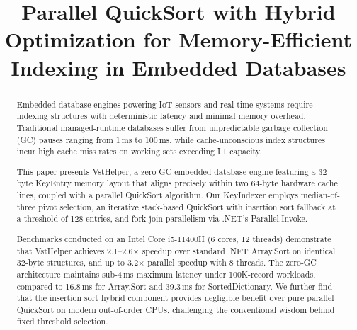 \documentclass[conference]{IEEEtran}
\begin{document}
\title{Parallel QuickSort with Hybrid Optimization for Memory-Efficient Indexing in Embedded Databases}

\author{
}

\maketitle

\begin{abstract}
Embedded database engines powering IoT sensors and real-time systems require indexing structures with deterministic latency and minimal memory overhead. Traditional managed-runtime databases suffer from unpredictable garbage collection (GC) pauses ranging from 1\,ms to 100\,ms, while cache-unconscious index structures incur high cache miss rates on working sets exceeding L1 capacity.

This paper presents VstHelper, a zero-GC embedded database engine featuring a 32-byte KeyEntry memory layout that aligns precisely within two 64-byte hardware cache lines, coupled with a parallel QuickSort algorithm. Our KeyIndexer employs median-of-three pivot selection, an iterative stack-based QuickSort with insertion sort fallback at a threshold of 128 entries, and fork-join parallelism via .NET's Parallel.Invoke.

Benchmarks conducted on an Intel Core i5-11400H (6 cores, 12 threads) demonstrate that VstHelper achieves 2.1--2.6$\times$ speedup over standard .NET Array.Sort on identical 32-byte structures, and up to 3.2$\times$ parallel speedup with 8 threads. The zero-GC architecture maintains sub-4\,ms maximum latency under 100K-record workloads, compared to 16.8\,ms for Array.Sort and 39.3\,ms for SortedDictionary. We further find that the insertion sort hybrid component provides negligible benefit over pure parallel QuickSort on modern out-of-order CPUs, challenging the conventional wisdom behind fixed threshold selection.
\end{abstract}
\end{document}
